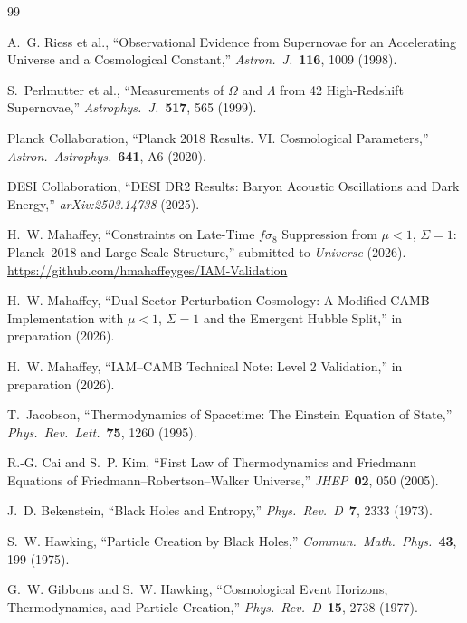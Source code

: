 \documentclass[12pt,letterpaper]{article}
\begin{document}

\begin{thebibliography}{99}

A.~G. Riess et al.,
``Observational Evidence from Supernovae for an Accelerating Universe and a Cosmological Constant,''
\textit{Astron.\ J.}\ \textbf{116}, 1009 (1998).

S.~Perlmutter et al.,
``Measurements of $\Omega$ and $\Lambda$ from 42 High-Redshift Supernovae,''
\textit{Astrophys.\ J.}\ \textbf{517}, 565 (1999).

Planck Collaboration,
``Planck 2018 Results. VI. Cosmological Parameters,''
\textit{Astron.\ Astrophys.}\ \textbf{641}, A6 (2020).

DESI Collaboration,
``DESI DR2 Results: Baryon Acoustic Oscillations and Dark Energy,''
\textit{arXiv:2503.14738} (2025).

H.~W. Mahaffey,
``Constraints on Late-Time $f\sigma_8$ Suppression from $\mu < 1$, $\Sigma = 1$: Planck~2018 and Large-Scale Structure,''
submitted to \textit{Universe} (2026).
\url{https://github.com/hmahaffeyges/IAM-Validation}

H.~W. Mahaffey,
``Dual-Sector Perturbation Cosmology: A Modified CAMB Implementation with $\mu < 1$, $\Sigma = 1$ and the Emergent Hubble Split,''
in preparation (2026).

H.~W. Mahaffey,
``IAM--CAMB Technical Note: Level 2 Validation,''
in preparation (2026).

T.~Jacobson,
``Thermodynamics of Spacetime: The Einstein Equation of State,''
\textit{Phys.\ Rev.\ Lett.}\ \textbf{75}, 1260 (1995).

R.-G. Cai and S.~P. Kim,
``First Law of Thermodynamics and Friedmann Equations of Friedmann--Robertson--Walker Universe,''
\textit{JHEP}\ \textbf{02}, 050 (2005).

J.~D. Bekenstein,
``Black Holes and Entropy,''
\textit{Phys.\ Rev.\ D}\ \textbf{7}, 2333 (1973).

S.~W. Hawking,
``Particle Creation by Black Holes,''
\textit{Commun.\ Math.\ Phys.}\ \textbf{43}, 199 (1975).

G.~W. Gibbons and S.~W. Hawking,
``Cosmological Event Horizons, Thermodynamics, and Particle Creation,''
\textit{Phys.\ Rev.\ D}\ \textbf{15}, 2738 (1977).


\end{thebibliography}
\end{document}
